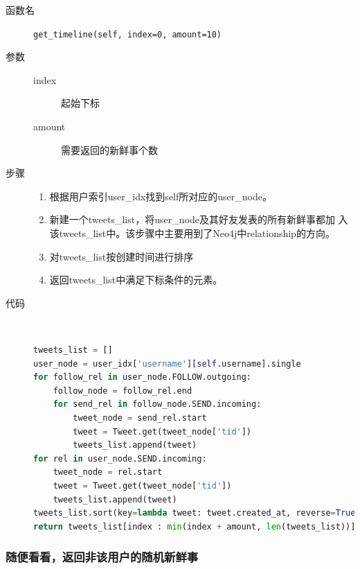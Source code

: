 \documentclass{yaldc}
\begin{document}
\begin{description}
    \item[函数名] \verb|get_timeline(self, index=0, amount=10)|
    \item[参数]
        \begin{description}
            \item[index] 起始下标
            \item[amount] 需要返回的新鲜事个数
        \end{description}
    \item[步骤]
        \begin{enumerate}
            \item 根据用户索引user\_idx找到self所对应的user\_node。
            \item 新建一个tweets\_list，将user\_node及其好友发表的所有新鲜事都加
                入该tweets\_list中。该步骤中主要用到了Neo4j中relationship的方向。
            \item 对tweets\_list按创建时间进行排序
            \item 返回tweets\_list中满足下标条件的元素。
        \end{enumerate}
    \item[代码] ~
        \begin{lstlisting}[language=Python]
tweets_list = []
user_node = user_idx['username'][self.username].single
for follow_rel in user_node.FOLLOW.outgoing:
    follow_node = follow_rel.end
    for send_rel in follow_node.SEND.incoming:
        tweet_node = send_rel.start
        tweet = Tweet.get(tweet_node['tid'])
        tweets_list.append(tweet)
for rel in user_node.SEND.incoming:
    tweet_node = rel.start
    tweet = Tweet.get(tweet_node['tid'])
    tweets_list.append(tweet)
tweets_list.sort(key=lambda tweet: tweet.created_at, reverse=True)
return tweets_list[index : min(index + amount, len(tweets_list))]
        \end{lstlisting}
\end{description}

\subsubsection{随便看看，返回非该用户的随机新鲜事}
\end{document}
